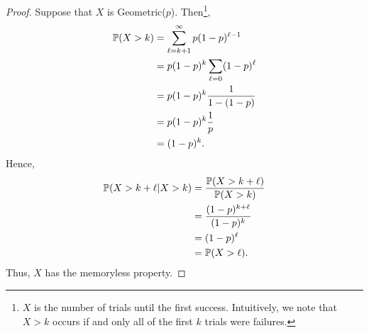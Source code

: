 \begin{mdframed}[]
    \begin{proof}
        Suppose that $X$ is Geometric($p$). Then\footnote{$X$ is the number of trials until the first success. Intuitively, we note that $X > k$ occurs if and only all of the first $k$ trials were failures.}, 
        \begin{equation*}
            \begin{aligned}
                \mathbb{P}(X > k) &= \sum_{\ell = k + 1}^{\infty} p(1 - p)^{\ell - 1} \\ 
                    &= p(1 - p)^k \sum_{\ell = 0} (1 - p)^{\ell} \\ 
                    &= p(1 - p)^k \frac{1}{1 - (1 - p)} \\ 
                    &= p(1 - p)^k \frac{1}{p} \\ 
                    &= (1 - p)^k.
            \end{aligned}
        \end{equation*}
        Hence, 
        \begin{equation*}
            \begin{aligned}
                \mathbb{P}(X > k + \ell | X > k) &= \frac{\mathbb{P}(X > k + \ell)}{\mathbb{P}(X > k)} \\ 
                    &= \frac{(1 - p)^{k + \ell}}{(1 - p)^k} \\ 
                    &= (1 - p)^{\ell} \\ 
                    &= \mathbb{P}(X > \ell).
            \end{aligned}
        \end{equation*}
        Thus, $X$ has the memoryless property.
    \end{proof}
\end{mdframed}

